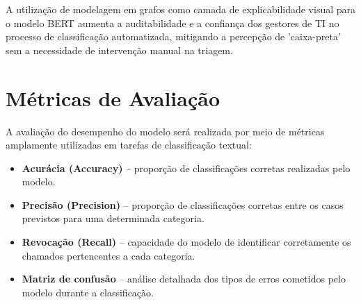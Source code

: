 \documentclass[
    12pt,                %
    openright,           %
    oneside,             %
    a4paper,             %
    english,             %
    brazil               %
]{abntex2}
\begin{document}
A utilização de modelagem em grafos como camada de explicabilidade visual para o modelo BERT aumenta a auditabilidade e a confiança dos gestores de TI no processo de classificação automatizada, mitigando a percepção de 'caixa-preta' sem a necessidade de intervenção manual na triagem.

\section{Métricas de Avaliação}
\label{sec:metricas_avaliacao}

A avaliação do desempenho do modelo será realizada por meio de métricas amplamente utilizadas em tarefas de classificação textual:

\begin{itemize}
\item \textbf{Acurácia (Accuracy)} – proporção de classificações corretas realizadas pelo modelo.

\item \textbf{Precisão (Precision)} – proporção de classificações corretas entre os casos previstos para uma determinada categoria.

\item \textbf{Revocação (Recall)} – capacidade do modelo de identificar corretamente os chamados pertencentes a cada categoria.

\item \textbf{Matriz de confusão} – análise detalhada dos tipos de erros cometidos pelo modelo durante a classificação.
\end{itemize}



\end{document}
